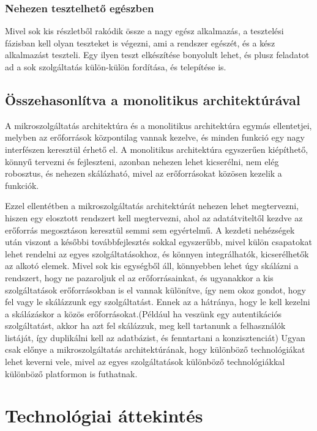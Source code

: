 \documentclass[11pt,magyar,a4paper,twoside,]{report}
\begin{document}
\subsubsection{Nehezen tesztelhető
egészben}\label{nehezen-tesztelhetux151-eguxe9szben}

Mivel sok kis részletből rakódik össze a nagy egész alkalmazás, a
tesztelési fázisban kell olyan teszteket is végezni, ami a rendszer
egészét, és a kész alkalmazást teszteli. Egy ilyen teszt elkészítése
bonyolult lehet, és plusz feladatot ad a sok szolgáltatás külön-külön
fordítása, és telepítése is.

\subsection{Összehasonlítva a monolitikus
architektúrával}\label{uxf6sszehasonluxedtva-a-monolitikus-architektuxfaruxe1val}

A mikroszolgáltatás architektúra és a monolitikus architektúra egymás
ellentetjei, melyben az erőforrások központilag vannak kezelve, és
minden funkció egy nagy interfészen keresztül érhető el. A monolitikus
architektúra egyszerűen kiépíthető, könnyű tervezni és fejleszteni,
azonban nehezen lehet kicserélni, nem elég robosztus, és nehezen
skálázható, mivel az erőforrásokat közösen kezelik a funkciók.

Ezzel ellentétben a mikroszolgáltatás architektúrát nehezen lehet
megtervezni, hiszen egy elosztott rendszert kell megtervezni, ahol az
adatátviteltől kezdve az erőforrás megosztáson keresztül semmi sem
egyértelmű. A kezdeti nehézségek után viszont a későbbi továbbfejlesztés
sokkal egyszerűbb, mivel külön csapatokat lehet rendelni az egyes
szolgáltatásokhoz, és könnyen integrálhatók, kicserélhetők az alkotó
elemek. Mivel sok kis egységből áll, könnyebben lehet úgy skálázni a
rendszert, hogy ne pazaroljuk el az erőforrásainkat, és ugyanakkor a kis
szolgáltatások erőforrásokban is el vannak különítve, így nem okoz
gondot, hogy fel vagy le skálázzunk egy szolgáltatást. Ennek az a
hátránya, hogy le kell kezelni a skálázáskor a közös
erőforrásokat.(Például ha veszünk egy autentikációs szolgáltatást, akkor
ha azt fel skálázzuk, meg kell tartanunk a felhasználók listáját, így
duplikálni kell az adatbázist, és fenntartani a konzisztenciát) Ugyan
csak előnye a mikroszolgáltatás architektúrának, hogy különböző
technológiákat lehet keverni vele, mivel az egyes szolgáltatások
különböző technológiákkal különböző platformon is futhatnak.

\section{Technológiai
áttekintés}\label{technoluxf3giai-uxe1ttekintuxe9s}
\end{document}
